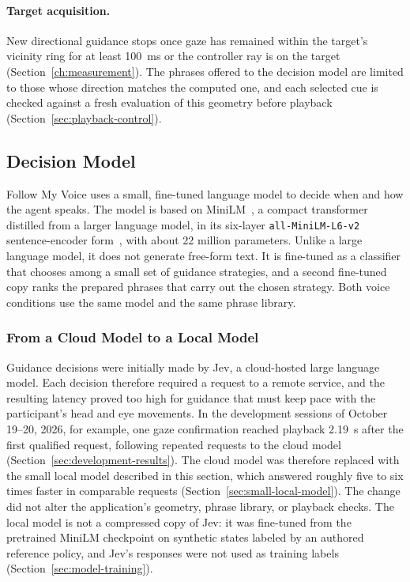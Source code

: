 \paragraph{Target acquisition.} New directional guidance stops once gaze has remained within the target's vicinity ring for at least 100~ms or the controller ray is on the target (Section~\ref{ch:measurement}). The phrases offered to the decision model are limited to those whose direction matches the computed one, and each selected cue is checked against a fresh evaluation of this geometry before playback (Section~\ref{sec:playback-control}).

\subsection{Decision Model}
\label{sec:decision-model}
Follow My Voice uses a small, fine-tuned language model to decide when and how the agent speaks. The model is based on MiniLM~\cite{wang2020minilm}, a compact transformer distilled from a larger language model, in its six-layer \texttt{all-MiniLM-L6-v2} sentence-encoder form~\cite{reimers2019sbert}, with about 22 million parameters. Unlike a large language model, it does not generate free-form text. It is fine-tuned as a classifier that chooses among a small set of guidance strategies, and a second fine-tuned copy ranks the prepared phrases that carry out the chosen strategy. Both voice conditions use the same model and the same phrase library.

\subsubsection{From a Cloud Model to a Local Model}
\label{sec:cloud-to-local}
Guidance decisions were initially made by Jev, a cloud-hosted large language model. Each decision therefore required a request to a remote service, and the resulting latency proved too high for guidance that must keep pace with the participant's head and eye movements. In the development sessions of October 19--20, 2026, for example, one gaze confirmation reached playback 2.19~s after the first qualified request, following repeated requests to the cloud model (Section~\ref{sec:development-results}). The cloud model was therefore replaced with the small local model described in this section, which answered roughly five to six times faster in comparable requests (Section~\ref{sec:small-local-model}). The change did not alter the application's geometry, phrase library, or playback checks. The local model is not a compressed copy of Jev: it was fine-tuned from the pretrained MiniLM checkpoint on synthetic states labeled by an authored reference policy, and Jev's responses were not used as training labels (Section~\ref{sec:model-training}).

